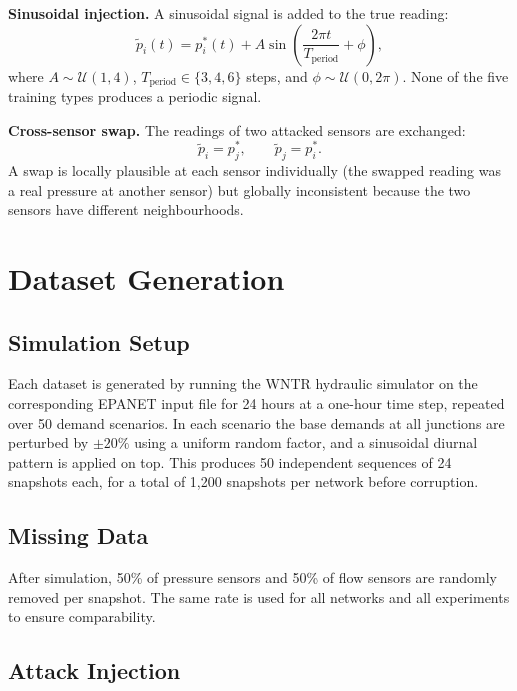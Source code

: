 \textbf{Sinusoidal injection.} A sinusoidal signal is added to the
true reading:
\begin{equation}
  \tilde{p}_i(t) = p_i^*(t) + A \sin\!\left(
    \frac{2\pi t}{T_\text{period}} + \phi
  \right),
\end{equation}
where $A \sim \mathcal{U}(1, 4)$, $T_\text{period} \in \{3, 4, 6\}$
steps, and $\phi \sim \mathcal{U}(0, 2\pi)$. None of the five
training types produces a periodic signal.

\textbf{Cross-sensor swap.} The readings of two attacked sensors are
exchanged:
\begin{equation}
  \tilde{p}_i = p_j^*, \qquad \tilde{p}_j = p_i^*.
\end{equation}
A swap is locally plausible at each sensor individually (the swapped
reading was a real pressure at another sensor) but globally
inconsistent because the two sensors have different neighbourhoods.

\section{Dataset Generation}
\label{sec:dataset}

\subsection{Simulation Setup}

Each dataset is generated by running the WNTR hydraulic
simulator on the corresponding EPANET input file for 24
hours at a one-hour time step, repeated over 50 demand scenarios.
In each scenario the base demands at all junctions are perturbed by
$\pm 20\%$ using a uniform random factor, and a sinusoidal diurnal
pattern is applied on top. This produces 50 independent sequences
of 24 snapshots each, for a total of 1,200 snapshots per network
before corruption.

\subsection{Missing Data}

After simulation, 50\% of pressure sensors and 50\% of flow sensors
are randomly removed per snapshot. The same rate is used for all
networks and all experiments to ensure comparability.

\subsection{Attack Injection}

